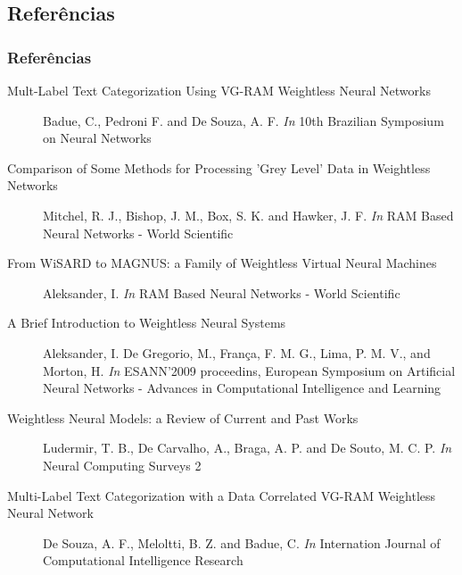 \documentclass{beamer}
\begin{document}
\subsection{Referências}
\begin{frame}
    \frametitle{Referências}
    \tiny
    \begin{description}
        \item[Mult-Label Text Categorization Using VG-RAM Weightless Neural Networks] Badue, C., Pedroni F. and De Souza, A. F. \emph{In} 10th Brazilian Symposium on Neural Networks
        \item[Comparison of Some Methods for Processing 'Grey Level' Data in Weightless Networks] Mitchel, R. J., Bishop, J. M., Box, S. K. and Hawker, J. F. \emph{In} RAM Based Neural Networks - World Scientific
        \item[From WiSARD to MAGNUS: a Family of Weightless Virtual Neural Machines] Aleksander, I. \emph{In} RAM Based Neural Networks - World Scientific
        \item[A Brief Introduction to Weightless Neural Systems] Aleksander, I. De Gregorio, M., França, F. M. G., Lima, P. M. V., and Morton, H. \emph{In} ESANN'2009 proceedins, European Symposium on Artificial Neural Networks - Advances in Computational Intelligence and Learning
        \item[Weightless Neural Models: a Review of Current and Past Works] Ludermir, T. B., De Carvalho, A., Braga, A. P. and De Souto, M. C. P. \emph{In} Neural Computing Surveys 2
        \item[Multi-Label Text Categorization with a Data Correlated VG-RAM Weightless Neural Network] De Souza, A. F., Meloltti, B. Z. and Badue, C. \emph{In} Internation Journal of Computational Intelligence Research
    \end{description}
\end{frame}
\end{document}
